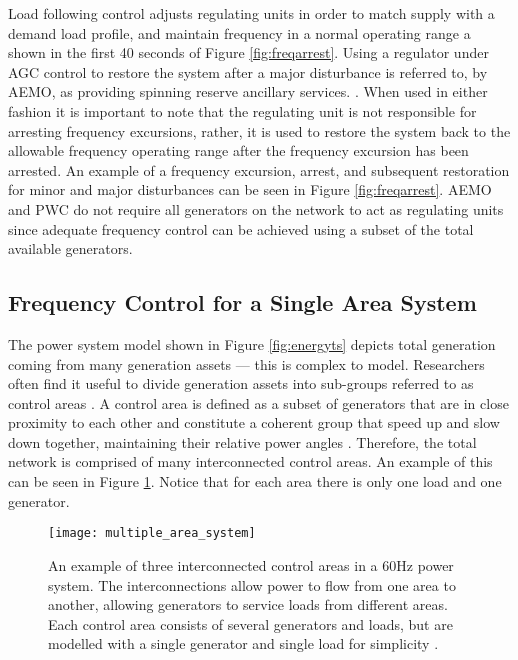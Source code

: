 \newpage

Load following control adjusts regulating units in order to match supply with a demand load profile, and maintain frequency in a normal operating range a shown in the first 40 seconds of Figure \ref{fig:freqarrest}. Using a regulator under AGC control to restore the system after a major disturbance is referred to, by AEMO, as providing spinning reserve ancillary services. \cite{AEMOancilliaryserv}. When used in either fashion it is important to note that the regulating unit is not responsible for arresting frequency excursions, rather, it is used to restore the system back to the allowable frequency operating range after the frequency excursion has been arrested. An example of a frequency excursion, arrest, and subsequent restoration for minor and major disturbances can be seen in Figure \ref{fig:freqarrest}. AEMO and PWC do not require all generators on the network to act as regulating units since adequate frequency control can be achieved using a subset of the total available generators.


\subsection{Frequency Control for a Single Area System}\label{oneareapowersystem}
The power system model shown in Figure \ref{fig:energyts} depicts total generation coming from many generation assets --- this is complex to model. Researchers often find it useful to divide generation assets into sub-groups referred to as control areas \cite{Kothari2011}. A control area is defined as a subset of generators that are in close proximity to each other and constitute a coherent group that speed up and slow down together, maintaining their relative power angles \cite{Kothari2011}. Therefore, the total network is comprised of many interconnected control areas. An example of this can be seen in Figure \ref{fig:interconnectedpa}. Notice that for each area there is only one load and one generator.
\begin{figure}[ht]
	\centering
	\texttt{[image: multiple\_area\_system]}
	\caption{An example of three interconnected control areas in a 60$\si{\hertz}$ power system. The interconnections allow power to flow from one area to another, allowing generators to service loads from different areas. Each control area consists of several generators and loads, but are modelled with a single generator and single load for simplicity \cite{Grainger1994}.}
	\label{fig:interconnectedpa}
\end{figure}

